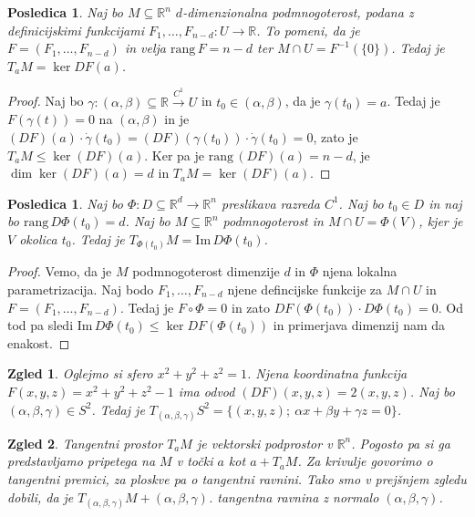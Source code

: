 \documentclass[10pt, a4paper]{article}
\newtheorem{posledica}[izr]{Posledica}
\newtheorem{zgled}{Zgled}[section]
\newenvironment{noticeC}{%
  \tcolorbox[%
  notitle,
  empty,
  enhanced,  %
  breakable,
  coltext=black, 
  fontupper=\rmfamily,
  parbox=false,
  noparskip,
  sharp corners,
  boxrule=-1pt,  %
  frame hidden,
  left=7pt,  %
  right=7pt,
  top=5pt,
  bottom=5pt,
  before skip=2.5ex plus 2pt,
  after skip=2.5ex plus 2pt,
  overlay unbroken and last={%
  },
  ]}
{\endtcolorbox}
\newenvironment{dokaz}%
  {\begin{noticeC}\begin{proof}}%
  {\end{proof}\end{noticeC}}
\newcommand{\R}{\mathbb {R}}
\newcommand{\im}{\mathrm{Im}\,}
\newcommand{\rang}{\mathrm{\text{rang}}\,}
\begin{document}
\begin{posledica}
  Naj bo $M \subseteq \R^n$ $d$-dimenzionalna podmnogoterost, podana 
  z definicijskimi funkcijami $F_1, \dots, F_{n - d} : U \to \R$.
  To pomeni, da je $F = (F_1, \dots, F_{n - d})$ in velja $\rang F = n - d$
  ter $M \cap U = F^{-1} (\{0\})$.
  Tedaj je $T_a M = \ker DF (a)$.
\end{posledica}

\begin{dokaz}
  Naj bo $\gamma: (\alpha, \beta) \subseteq \R \stackrel{C^1}{\to} U$ 
  in $t_0 \in (\alpha, \beta)$, da je $\gamma (t_0) = a$.
  Tedaj je $F(\gamma (t)) = 0$ na $(\alpha, \beta)$ in je 
  $(DF) (a) \cdot \dot{\gamma} (t_0) = (DF) (\gamma (t_0)) \cdot \dot{\gamma} (t_0) = 0$,  
  zato je $T_a M \leq \ker (DF) (a)$. Ker pa je 
  $\rang (DF) (a) = n - d$, je $\dim \ker (DF) (a) = d$
  in $T_a M = \ker (DF) (a)$.
\end{dokaz}

\begin{posledica}
  Naj bo $\Phi: D \subseteq \R^d \to \R^n$ preslikava
  razreda $C^1$. Naj bo $t_0 \in D$ in naj bo $\rang D\Phi (t_0) = d$.
  Naj bo $M \subseteq \R^n$ podmnogoterost in $M \cap U = \Phi (V)$,
  kjer je $V$ okolica $t_0$.
  Tedaj je $T_{\Phi(t_0)} M = \im D \Phi (t_0)$.
\end{posledica}

\begin{dokaz}
  Vemo, da je $M$ podmnogoterost dimenzije $d$ in 
  $\Phi$ njena lokalna parametrizacija.
  Naj bodo $F_1, \dots, F_{n - d}$ njene defincijske funkcije 
  za $M \cap U$ in $F = (F_1, \dots, F_{n - d})$.
  Tedaj je $F \circ \Phi = 0$ in zato $DF(\Phi (t_0)) \cdot D \Phi (t_0) = 0$.
  Od tod pa sledi $\im D\Phi (t_0) \leq \ker DF (\Phi(t_0))$ 
  in primerjava dimenzij nam da enakost.
\end{dokaz}

\begin{zgled}
  Oglejmo si sfero $x^2 + y^2 + z^2 = 1$.
  Njena koordinatna funkcija $F(x, y, z) = x^2 + y^2 + z^2 - 1$
  ima odvod $(DF) (x, y, z) = 2 (x, y, z)$.
  Naj bo $(\alpha, \beta, \gamma) \in S^2$.
  Tedaj je $T_{(\alpha, \beta, \gamma)} S^2 = \{(x, y, z);\ \alpha x + \beta y + \gamma z = 0\}$.
\end{zgled}

\begin{zgled}
  Tangentni prostor $T_a M$ je vektorski podprostor v $\R^n$.
  Pogosto pa si ga predstavljamo pripetega na $M$ v točki $a$ kot $a + T_a M$.
  Za krivulje govorimo o tangentni premici, za ploskve pa o tangentni ravnini.
  Tako smo v prejšnjem zgledu dobili, da je $T_{(\alpha, \beta, \gamma)} M + (\alpha, \beta, \gamma)$.
  tangentna ravnina z normalo $(\alpha, \beta, \gamma)$. 
\end{zgled}
\end{document}
